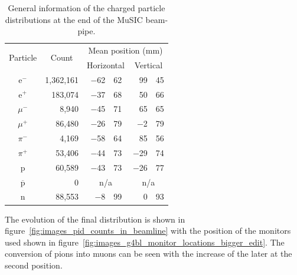 \begin{table}
  \begin{center}
  \begin{tabular}{c | r | r@{\(\pm\)}l | r@{\(\pm\)}l }
    \multicolumn{1}{c|}{\multirow{2}{*}{Particle}} 
               &   \multicolumn{1}{c|}{\multirow{2}{*}{Count}} 
                              &  \multicolumn{4}{c}{Mean position (mm)}    \\
               &              &  \multicolumn{2}{c|}{Horizontal}  
                                              &  \multicolumn{2}{c}{Vertical} \\
    \hline
      e\(^-\)  &  1,362,161  &  \(-\)62 & 62  &       99 & 45  \\
      e\(^+\)  &    183,074  &  \(-\)37 & 68  &       50 & 66  \\
    \(\mu^-\)  &      8,940  &  \(-\)45 & 71  &       65 & 65  \\
    \(\mu^+\)  &     86,480  &  \(-\)26 & 79  &   \(-\)2 & 79  \\
    \(\pi^-\)  &      4,169  &  \(-\)58 & 64  &       85 & 56  \\
    \(\pi^+\)  &     53,406  &  \(-\)44 & 73  &  \(-\)29 & 74  \\
       p       &     60,589  &  \(-\)43 & 73  &  \(-\)26 & 77  \\
    \(\overline{\text{p}}\)
               &          0  & \multicolumn{2}{c|}{n/a}  
                                              &  \multicolumn{2}{c}{n/a}  \\
       n       &     88,553  &   \(-\)8 & 99  &        0 & 93  \\
  \end{tabular}
  \end{center}
  \caption{General information of the charged particle distributions at the end of the MuSIC beam-pipe.}
  \label{tab:g4bl_particle_counts}
\end{table}

The evolution of the final distribution is shown in figure~\ref{fig:images_pid_counts_in_beamline} with the position of the monitors used shown in figure~\ref{fig:images_g4bl_monitor_locations_bigger_edit}. The conversion of pions into muons can be seen with the increase of the later at the second position.

